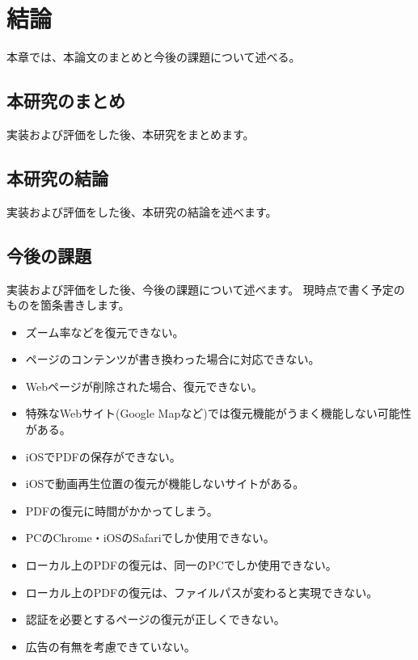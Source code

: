 \chapter{結論}
\label{chap:conclusion}
本章では、本論文のまとめと今後の課題について述べる。

\section{本研究のまとめ}
\label{section:conclusion}
実装および評価をした後、本研究をまとめます。

\section{本研究の結論}
実装および評価をした後、本研究の結論を述べます。

\section{今後の課題}
実装および評価をした後、今後の課題について述べます。
現時点で書く予定のものを箇条書きします。

\begin{itemize}
\item ズーム率などを復元できない。
\item ページのコンテンツが書き換わった場合に対応できない。
\item Webページが削除された場合、復元できない。
\item 特殊なWebサイト(Google Mapなど)では復元機能がうまく機能しない可能性がある。
\item iOSでPDFの保存ができない。
\item iOSで動画再生位置の復元が機能しないサイトがある。
\item PDFの復元に時間がかかってしまう。
\item PCのChrome・iOSのSafariでしか使用できない。
\item ローカル上のPDFの復元は、同一のPCでしか使用できない。
\item ローカル上のPDFの復元は、ファイルパスが変わると実現できない。
\item 認証を必要とするページの復元が正しくできない。
\item 広告の有無を考慮できていない。
\end{itemize}
